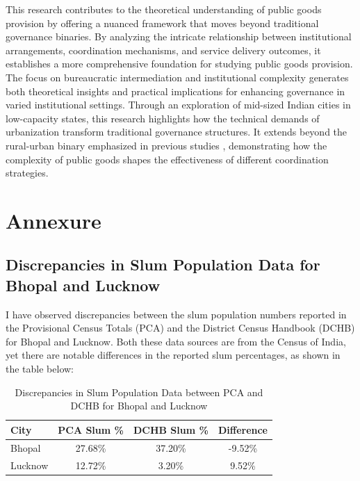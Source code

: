 This research contributes to the theoretical understanding of public goods provision by offering a nuanced framework that moves beyond traditional governance binaries. By analyzing the intricate relationship between institutional arrangements, coordination mechanisms, and service delivery outcomes, it establishes a more comprehensive foundation for studying public goods provision. The focus on bureaucratic intermediation and institutional complexity generates both theoretical insights and practical implications for enhancing governance in varied institutional settings. Through an exploration of mid-sized Indian cities in low-capacity states, this research highlights how the technical demands of urbanization transform traditional governance structures. It extends beyond the rural-urban binary emphasized in previous studies \citep{varshney_democracy_1995}, demonstrating how the complexity of public goods shapes the effectiveness of different coordination strategies. 








\section{Annexure}


\subsection{ Discrepancies in Slum Population Data for Bhopal and Lucknow}

I have observed discrepancies between the slum population numbers reported in the Provisional Census Totals (PCA) and the District Census Handbook (DCHB) for Bhopal and Lucknow. Both these data sources are from the Census of India, yet there are notable differences in the reported slum percentages, as shown in the table below:

\begin{table}[H]
\centering
\caption{Discrepancies in Slum Population Data between PCA and DCHB for Bhopal and Lucknow}
\begin{tabular}{|l|c|c|c|}
\hline
\textbf{City}    & \textbf{PCA Slum \%} & \textbf{DCHB Slum \%} & \textbf{Difference} \\ \hline
Bhopal           & 27.68\%              & 37.20\%               & -9.52\%             \\ \hline
Lucknow          & 12.72\%              & 3.20\%                & 9.52\%              \\ \hline
\end{tabular}
\end{table}

